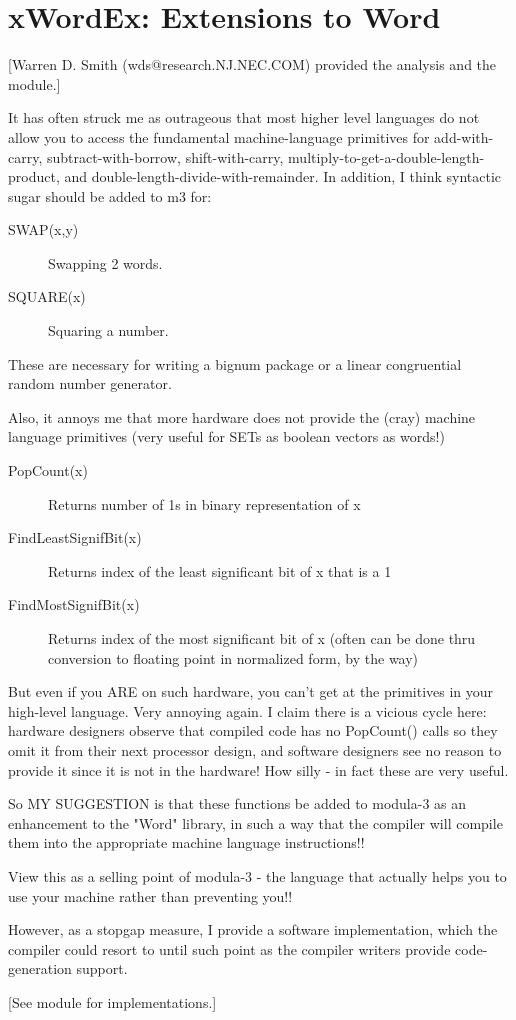\section{xWordEx: Extensions to Word}
[Warren D. Smith (wds@research.NJ.NEC.COM) provided the
analysis and the module.]

It has often struck me as outrageous that most higher level
languages do not allow you to access the fundamental machine-language
primitives for add-with-carry, subtract-with-borrow, shift-with-carry,
multiply-to-get-a-double-length-product, and
double-length-divide-with-remainder. In addition, 
I think syntactic sugar should be added to m3 for:
\begin{description}
\item[SWAP(x,y)] Swapping 2 words.
\item[SQUARE(x)] Squaring a number.
\end{description}

These are necessary for writing a bignum package or a linear congruential
random number generator.

Also, it annoys me that more hardware does not provide the (cray)
machine language primitives (very useful for SETs as boolean vectors as words!)
\begin{description}
\item[PopCount(x)] Returns number of 1s in binary representation of x
\item[FindLeastSignifBit(x)]  Returns index of the least significant
bit of x that is a 1
\item[FindMostSignifBit(x)]  Returns index of the  most significant
bit of x (often can be done thru conversion to floating
point in normalized form, by the way)
\end{description}

But even if you ARE on such hardware, you can't get at the primitives
in your high-level language. Very annoying again. I claim there is a vicious
cycle here: hardware designers observe that compiled code has no PopCount()
calls so they omit it from their next processor design, and software
designers see no reason to provide it since it is not in the hardware!
How silly - in fact these are very useful.

So MY SUGGESTION is that these functions be added to modula-3 as an
enhancement to the "Word" library, in such a way that the compiler
will compile them into the appropriate machine language instructions!!

View this as a selling point of modula-3 - the language that actually
helps you to use your machine rather than preventing you!!

However, as a stopgap measure, I provide a software
implementation, which the compiler could resort to until such
point as the compiler writers provide code-generation support.

[See module for implementations.]
